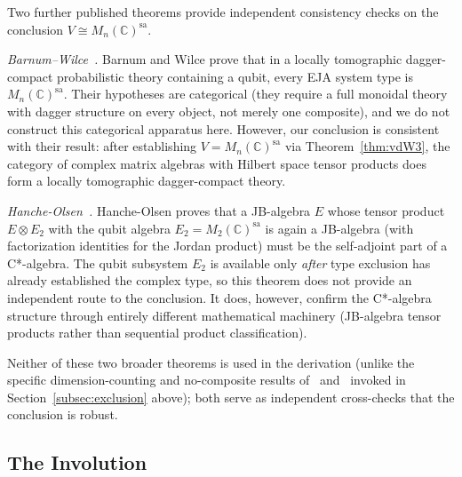 \begin{remark}\label{rem:consistency}
Two further published theorems provide independent consistency checks
on the conclusion $V \cong M_n(\mathbb{C})^{\mathrm{sa}}$.

\emph{Barnum--Wilce~\cite{BarnumWilce2014}.}
Barnum and Wilce prove that in a locally tomographic dagger-compact
probabilistic theory containing a qubit, every EJA system type is
$M_n(\mathbb{C})^{\mathrm{sa}}$.  Their hypotheses are categorical
(they require a full monoidal theory with dagger structure on every
object, not merely one composite), and we do not construct this
categorical apparatus here.  However, our conclusion is consistent
with their result: after establishing $V = M_n(\mathbb{C})^{\mathrm{sa}}$
via Theorem~\ref{thm:vdW3}, the category of complex matrix algebras
with Hilbert space tensor products does form a locally tomographic
dagger-compact theory.

\emph{Hanche-Olsen~\cite{HancheOlsen1985}.}
Hanche-Olsen proves that a JB-algebra $E$ whose tensor product
$E \otimes E_2$ with the qubit algebra
$E_2 = M_2(\mathbb{C})^{\mathrm{sa}}$ is again a JB-algebra
(with factorization identities for the Jordan product) must be the
self-adjoint part of a C*-algebra.  The qubit subsystem $E_2$ is
available only \emph{after} type exclusion has already established
the complex type, so this theorem does not provide an independent
route to the conclusion.  It does, however, confirm the C*-algebra
structure through entirely different mathematical machinery
(JB-algebra tensor products rather than sequential product
classification).

Neither of these two broader theorems is used in the derivation
(unlike the specific dimension-counting and no-composite results
of~\cite{BarnumWilce2014} and~\cite{BarnumUdudeckVdW2020} invoked
in Section~\ref{subsec:exclusion} above); both serve as independent
cross-checks that the conclusion is robust.
\end{remark}

\subsection{The Involution}\label{subsec:involution}

